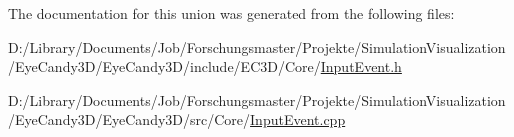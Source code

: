 The documentation for this union was generated from the following files\+:\begin{DoxyCompactItemize}
\item 
D\+:/\+Library/\+Documents/\+Job/\+Forschungsmaster/\+Projekte/\+Simulation\+Visualization/\+Eye\+Candy3\+D/\+Eye\+Candy3\+D/include/\+E\+C3\+D/\+Core/\mbox{\hyperlink{_input_event_8h}{Input\+Event.\+h}}\item 
D\+:/\+Library/\+Documents/\+Job/\+Forschungsmaster/\+Projekte/\+Simulation\+Visualization/\+Eye\+Candy3\+D/\+Eye\+Candy3\+D/src/\+Core/\mbox{\hyperlink{_input_event_8cpp}{Input\+Event.\+cpp}}\end{DoxyCompactItemize}
